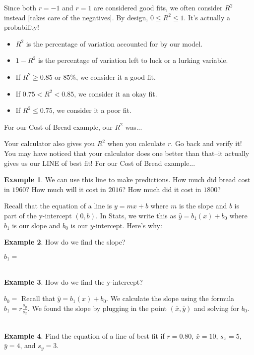 \documentclass[12pt]{amsart}
\theoremstyle{definition}
\newtheorem{ex}{Example}
\begin{document}
\vspace{0.25in}
\newpage
\begin{framed} Since both $r=-1$ and $r=1$ are considered good fits, we often consider $R^2$ instead [takes care of the negatives]. By design, $0\leq R^2\leq 1$. It's actually a probability!
\begin{itemize}
	\item $R^2$ is the percentage of variation accounted for by our model.
	\item $1-R^2$ is the percentage of variation left to luck or a lurking variable.
	\item If $R^2\geq 0.85$ or $85\%$, we consider it a good fit.
	\item If $0.75<R^2<0.85$, we consider it an okay fit.
	\item If $R^2\leq 0.75$, we consider it a poor fit.
\end{itemize}
\end{framed}

For our Cost of Bread example, our $R^2$ was...

\vspace{0.5in}
\noindent Your calculator also gives you $R^2$ when you calculate $r$. Go back and verify it!\\
You may have noticed that your calculator does one better than that--it actually gives us our LINE of best fit! For our Cost of Bread example...

\vfill
\begin{ex}We can use this line to make predictions. How much did bread cost in $1960?$ How much will it cost in $2016$? How much did it cost in $1800$? \end{ex}
\vfill
\vfill
\newpage
\noindent Recall that the equation of a line is $y=mx+b$ where $m$ is the slope and $b$ is part of the y-intercept $(0,b)$. In Stats, we write this as $\hat{y}=b_1(x)+b_0$ where $b_1$ is our slope and $b_0$ is our $y$-intercept. Here's why:

\vfill
\begin{ex} How do we find the slope? \end{ex}

\vfill
$b_1=$\\
~\\
\begin{ex} How do we find the y-intercept? \end{ex}

\vfill
$b_0=$
\vspace{0.2in}
\newpage
\noindent Recall that $\hat{y}=b_1(x)+b_0$. We calculate the slope using the formula $b_1=r\frac{s_y}{s_x}$. We found the slope by plugging in the point $(\bar{x},\bar{y})$ and solving for $b_0$.\\
~\\
\begin{ex} Find the equation of a line of best fit if $r=0.80$, $\bar{x}=10$, $s_x=5$, $\bar{y}=4$, and $s_y=3$.\end{ex}
\end{document}
